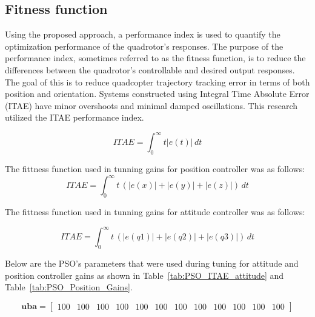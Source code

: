 \begin{small}
\begin{enumerate}
\begin{figure}[h!]

    \label{fig:PSO for sliding surface parameters}
\end{figure}

\subsection{Fitness function}


Using the proposed approach, a performance index is used to quantify the optimization 
performance of the quadrotor’s responses. The purpose of the performance index, sometimes 
referred to as the fitness function, is to reduce the differences between the quadrotor’s 
controllable and desired output responses. The goal of this  is to reduce quadcopter 
trajectory tracking error in terms of both position and orientation. Systems constructed 
using Integral Time Absolute Error (ITAE) have minor overshoots and minimal damped 
oscillations. This research utilized the ITAE performance index.

\begin{equation}
ITAE = \int_{0}^{\infty} t |e(t)| \, dt  
\end{equation}


The fittness function used in tunning gains for position controller was as follows:
\begin{equation}
ITAE = \int_{0}^{\infty} t\,\left( |e(x)| + |e(y)| + |e(z)| \right)\, dt
\label{eq:4.22}
\end{equation}

   The fittness function used in tunning gains for attitude controller was as follows:


\begin{equation}
ITAE = \int_{0}^{\infty} t\,\left( |e(q1)| + |e(q2)| + |e(q3)| \right)\, dt
\label{eq:4.23}
\end{equation}


Below are the PSO's parameters that were used during tuning for attitude and position controller gains  as shown in Table~\ref{tab:PSO_ITAE_attitude} and Table~\ref{tab:PSO_Position_Gains}.  %


 \small
  \setlength{\arraycolsep}{3pt}  %

  \[
  \mathbf{uba} =
  \left[
  \begin{array}{cccccccccccc}
  100 & 100 & 100 & 100 & 100 & 100 & 100 & 100 & 100 & 100 & 100 & 100
  \end{array}
  \right]
  \]


\end{enumerate}
\end{small}
